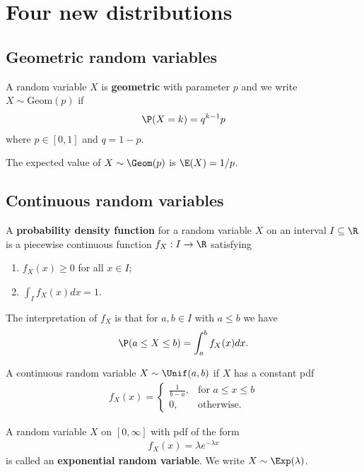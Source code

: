 \documentclass{article}
\begin{document}
\section{Four new distributions}
\subsection{Geometric random variables}
\begin{definition}
    A random variable $X$ is \textbf{geometric} with parameter $p$ and we write $X\sim \text{Geom}(p)$ if
    \begin{align*}
        \P(X=k)=q^{k-1}p
    \end{align*}
    where $p\in[0,1]$ and $q=1-p$.
\end{definition}
\begin{proposition}
    The expected value of $X\sim\Geom(p)$ is $\E(X)=1/p$.
\end{proposition}
\subsection{Continuous random variables}
\begin{definition}
    A \textbf{probability density function} for a random variable $X$ on an
    interval $I\subseteq\R$ is a piecewise continuous function $f_X:I\to\R$ satisfying
    \begin{enumerate}
        \item $f_X(x) \geq 0$ for all $x\in I$;
        \item $\int_I f_X(x) dx =1$.
    \end{enumerate}
    The interpretation of $f_X$ is that for $a,b\in I$ with $a\leq b$ we have
    \begin{align*}
        \P(a\leq X\leq b)=\int_a^b f_X(x)dx.
    \end{align*}
\end{definition}
\begin{definition}
    A continuous random variable $X\sim\Unif(a,b)$ if $X$ has a constant pdf
    \begin{align*}
        f_X(x) = \begin{cases}
            \frac{1}{b-a}, &\text{for }a\leq x\leq b\\
            0, &\text{otherwise.}
        \end{cases}
    \end{align*}
\end{definition}
\begin{definition}
    A random variable $X$ on $[0,\infty]$ with pdf of the form
    \begin{align*}
        f_X(x) = \lambda e^{-\lambda x}
    \end{align*}
    is called an \textbf{exponential random variable}.
    We write $X\sim\Exp(\lambda)$.
\end{definition}
\end{document}
